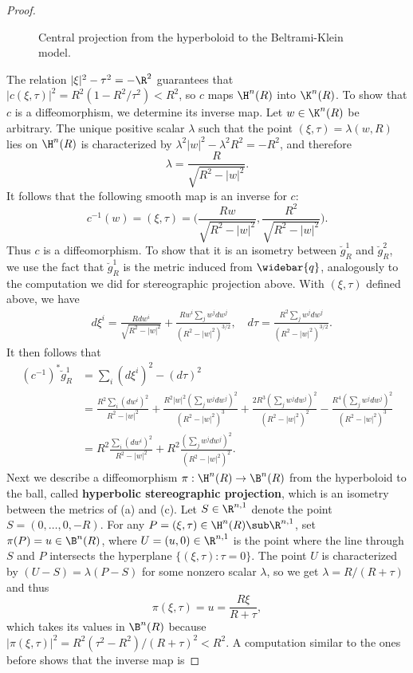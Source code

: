 \begin{proof}
\begin{figure}[htbp]
\caption{Central projection from the hyperboloid to the Beltrami-Klein model.}
\label{Hyperbolic central proj}
\end{figure}
The relation $|\xi|^2-\tau^2=-\R^2$ guarantees that $|c(\xi,\tau)|^2=R^2(1-R^2/\tau^2)<R^2$, so $c$ maps $\H^n(R)$ into $\K^n(R)$. To show that $c$ is a diffeomorphism, we determine its inverse map. Let $w\in\K^n(R)$ be arbitrary. The unique positive scalar $\lambda$ such that the point $(\xi,\tau)=\lambda(w,R)$ lies on $\H^n(R)$ is characterized by $\lambda^2|w|^2-\lambda^2R^2=-R^2$, and therefore
\[\lambda=\frac{R}{\sqrt{R^2-|w|^2}}.\]
It follows that the following smooth map is an inverse for $c$:
\[c^{-1}(w)=(\xi,\tau)=\Big(\frac{Rw}{\sqrt{R^2-|w|^2}},\frac{R^2}{\sqrt{R^2-|w|^2}}\Big).\]
Thus $c$ is a diffeomorphism. To show that it is an isometry between $\breve{g}^1_R$ and $\breve{g}^2_R$, we use the fact that $\breve{g}^1_R$ is the metric induced from $\widebar{q}$, analogously to the computation we did for stereographic projection above. With $(\xi,\tau)$ defined above, we have
\begin{align*}
& d\xi^i=\frac{Rdw^i}{\sqrt{R^2-|w|^2}}+\frac{Rw^i\sum_jw^jdw^j}{(R^2-|w|^2)^{3/2}},\quad d\tau=\frac{R^2\sum_jw^jdw^j}{(R^2-|w|^2)^{3/2}}.
\end{align*}
It then follows that
\begin{align*}
(c^{-1})^*\breve{g}^1_R&=\sum_i(d\xi^i)^2-(d\tau)^2\\
&=\frac{R^2\sum_i(dw^i)^2}{R^2-|w|^2}+\frac{R^2|w|^2(\sum_jw^jdw^j)^2}{(R^2-|w|^2)^3}+\frac{2R^3(\sum_jw^jdw^j)^2}{(R^2-|w|^2)^2}-\frac{R^4(\sum_jw^jdw^j)^2}{(R^2-|w|^2)^3}\\
&=R^2\frac{\sum_i(dw^i)^2}{R^2-|w|^2}+R^2\frac{(\sum_jw^jdw^j)^2}{(R^2-|w|^2)^2}.
\end{align*}
Next we describe a diffeomorphism $\pi:\H^n(R)\to\B^n(R)$ from the hyperboloid to the ball, called \textbf{hyperbolic stereographic projection}, which is an isometry between the metrics of (a) and (c). Let $S\in\R^{n,1}$ denote the point $S=(0,\dots,0,-R)$. For any $P=(\xi,\tau)\in\H^n(R)\sub\R^{n,1}$, set $\pi(P)=u\in\B^n(R)$, where $U=(u,0)\in\R^{n,1}$ is the point where the line through $S$ and $P$ intersects the hyperplane $\{(\xi,\tau):\tau=0\}$. The point $U$ is characterized by $(U-S)=\lambda(P-S)$ for some nonzero scalar $\lambda$, so we get $\lambda=R/(R+\tau)$ 
and thus
\[\pi(\xi,\tau)=u=\frac{R\xi}{R+\tau},\]
which takes its values in $\B^n(R)$ because $|\pi(\xi,\tau)|^2=R^2(\tau^2-R^2)/(R+\tau)^2<R^2$. A computation similar to the ones before shows that the inverse map is

\end{proof}
